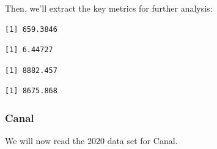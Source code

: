 Then, we'll extract the key metrics for further analysis:

\begin{Shaded}
\begin{Highlighting}[]
\SpecialCharTok{\$}
\end{Highlighting}
\end{Shaded}

\begin{verbatim}
[1] 659.3846
\end{verbatim}

\begin{Shaded}
\begin{Highlighting}[]
\SpecialCharTok{\$}
\end{Highlighting}
\end{Shaded}

\begin{verbatim}
[1] 6.44727
\end{verbatim}

\begin{Shaded}
\begin{Highlighting}[]
\SpecialCharTok{\$}
\end{Highlighting}
\end{Shaded}

\begin{verbatim}
[1] 8882.457
\end{verbatim}

\begin{Shaded}
\begin{Highlighting}[]
\SpecialCharTok{\$}
\end{Highlighting}
\end{Shaded}

\begin{verbatim}
[1] 8675.868
\end{verbatim}

\subsubsection{Canal}

We will now read the 2020 data set for Canal.

\begin{Shaded}
\begin{Highlighting}[]
\OtherTok{\textless{}{-}} 
\OtherTok{\textless{}{-}} \NormalTok{(}\NormalTok{,}\NormalTok{))}
\end{Highlighting}
\end{Shaded}

